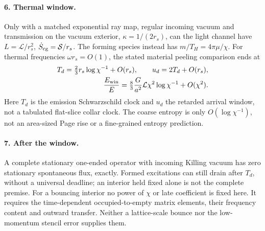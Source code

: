 \documentclass[10pt]{article}
\begin{document}
\paragraph{6. Thermal window.}
Only with a matched exponential ray map, regular incoming vacuum
and transmission on the vacuum exterior, \(\kappa=1/(2r_s)\), can the light channel have
\(L=\mathcal L/r_s^2\), \(\dot S_{\rm cg}=\mathcal S/r_s\).
The forming species instead has \(m/T_H=4\pi\mu/\chi\).
For thermal frequencies \(\omega r_s=O(1)\), the stated material
peeling comparison ends at
\[
\begin{aligned}
 T_d=\tfrac23r_s\log\chi^{-1}+O(r_s),\qquad
 u_d=2T_d+O(r_s),\\
 \frac{E_{\rm win}}E=\tfrac83\frac G{a^2}\mathcal L\chi^2\log\chi^{-1}
                      +O(\chi^2).
\end{aligned}
\]
Here \(T_d\) is the emission Schwarzschild clock and \(u_d\) the
retarded arrival window, not a tabulated flat-slice collar clock.
The coarse entropy is only \(O(\log\chi^{-1})\), not an area-sized
Page rise or a fine-grained entropy prediction.

\paragraph{7. After the window.}
A complete stationary one-ended operator with incoming Killing
vacuum has zero stationary spontaneous flux, exactly. Formed
excitations can still drain after \(T_d\), without a universal
deadline; an interior held fixed alone is not the complete premise.
For a bouncing interior no power of \(\chi\) or late coefficient
is fixed here. It requires the time-dependent occupied-to-empty
matrix elements, their frequency content and outward transfer.
Neither a lattice-scale bounce nor the low-momentum stencil error
supplies them.
\end{document}
